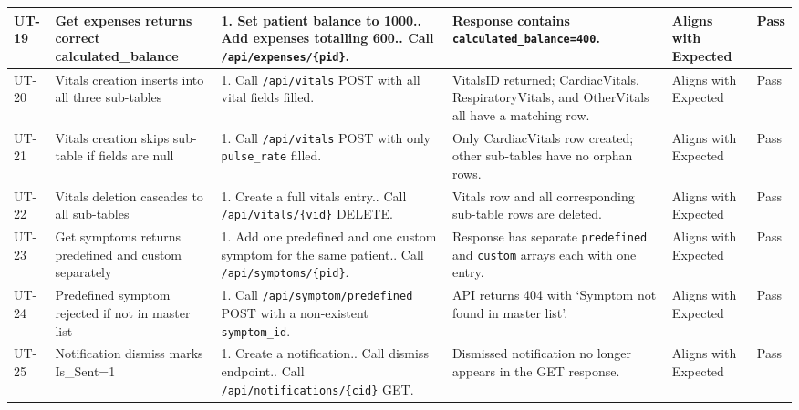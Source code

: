\documentclass[12pt,a4paper]{article}
\begin{document}
\begin{longtable}{|p{1cm}|p{2.5cm}|p{3.5cm}|p{3.5cm}|p{2cm}|p{1.2cm}|}
    UT-19 & Get expenses returns correct calculated\_balance &
        1. Set patient balance to 1000.\newline
        2. Add expenses totalling 600.\newline
        3. Call \texttt{/api/expenses/\{pid\}}. &
        Response contains \texttt{calculated\_balance=400}. &
        Aligns with Expected & Pass \\
    \hline
 
    UT-20 & Vitals creation inserts into all three sub-tables &
        1. Call \texttt{/api/vitals} POST with all vital fields filled. &
        VitalsID returned; CardiacVitals, RespiratoryVitals, and OtherVitals all have a matching row. &
        Aligns with Expected & Pass \\
    \hline
 
    UT-21 & Vitals creation skips sub-table if fields are null &
        1. Call \texttt{/api/vitals} POST with only \texttt{pulse\_rate} filled. &
        Only CardiacVitals row created; other sub-tables have no orphan rows. &
        Aligns with Expected & Pass \\
    \hline
 
    UT-22 & Vitals deletion cascades to all sub-tables &
        1. Create a full vitals entry.\newline
        2. Call \texttt{/api/vitals/\{vid\}} DELETE. &
        Vitals row and all corresponding sub-table rows are deleted. &
        Aligns with Expected & Pass \\
    \hline
 
    UT-23 & Get symptoms returns predefined and custom separately &
        1. Add one predefined and one custom symptom for the same patient.\newline
        2. Call \texttt{/api/symptoms/\{pid\}}. &
        Response has separate \texttt{predefined} and \texttt{custom} arrays each with one entry. &
        Aligns with Expected & Pass \\
    \hline
 
    UT-24 & Predefined symptom rejected if not in master list &
        1. Call \texttt{/api/symptom/predefined} POST with a non-existent \texttt{symptom\_id}. &
        API returns 404 with `Symptom not found in master list'. &
        Aligns with Expected & Pass \\
    \hline
 
    UT-25 & Notification dismiss marks Is\_Sent=1 &
        1. Create a notification.\newline
        2. Call dismiss endpoint.\newline
        3. Call \texttt{/api/notifications/\{cid\}} GET. &
        Dismissed notification no longer appears in the GET response. &
        Aligns with Expected & Pass \\
    \hline
 

\end{longtable}
\end{document}
